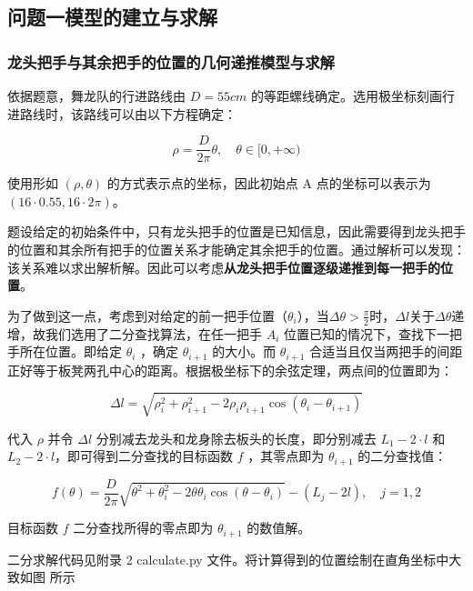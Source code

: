 \documentclass[a4paper]{article}
\begin{document}
	\subsection{问题一模型的建立与求解}
	\subsubsection{龙头把手与其余把手的位置的几何递推模型与求解}

		依据题意，舞龙队的行进路线由 $D = 55cm$ 的等距螺线确定。选用极坐标刻画行进路线时，该路线可以由以下方程确定：

		\begin{equation}
			\rho = \frac{D}{2\pi}\theta, \quad \theta \in [0,+\infty)
		\end{equation}

		使用形如 $(\rho, \theta)$ 的方式表示点的坐标，因此初始点 A 点的坐标可以表示为 $( 16 \cdot 0.55, 16 \cdot 2\pi )$。

		题设给定的初始条件中，只有龙头把手的位置是已知信息，因此需要得到龙头把手的位置和其余所有把手的位置关系才能确定其余把手的位置。通过解析可以发现：该关系难以求出解析解。因此可以考虑\textbf{从龙头把手位置逐级递推到每一把手的位置}。

		为了做到这一点，考虑到对给定的前一把手位置（$\theta_{i}$），当$\Delta \theta > \frac{\pi}{2}$时，$\Delta l$关于$\Delta \theta$递增，故我们选用了二分查找算法，在任一把手 $A_i$ 位置已知的情况下，查找下一把手所在位置。即给定 $\theta_{i}$ ，确定 $\theta_{i+1}$ 的大小。而 $\theta_{i+1}$ 合适当且仅当两把手的间距正好等于板凳两孔中心的距离。根据极坐标下的余弦定理，两点间的位置即为：

		$$\Delta l = \sqrt{\rho_i^2 + \rho_{i+1}^2 - 2\rho_i \rho_{i+1} \cos(\theta_i - \theta_{i+1})}$$

		代入 $\rho$ 并令 $\Delta l$ 分别减去龙头和龙身除去板头的长度，即分别减去 $L_1 - 2 \cdot l$ 和 $L_2 - 2 \cdot l$，即可得到二分查找的目标函数 $f$ ，其零点即为 $\theta_{i+1}$ 的二分查找值：

		\begin{equation}
			f(\theta) = \frac{D}{2\pi} \sqrt{\theta^2 + \theta_i^2 - 2\theta \theta_i \cos(\theta - \theta_i)} - (L_j - 2l), \quad j=1, 2
		\end{equation}

		目标函数 $f$ 二分查找所得的零点即为 $\theta_{i+1}$ 的数值解。

		二分求解代码见附录 2 calculate.py 文件。将计算得到的位置绘制在直角坐标中大致如图%
		所示
		
\end{document}
